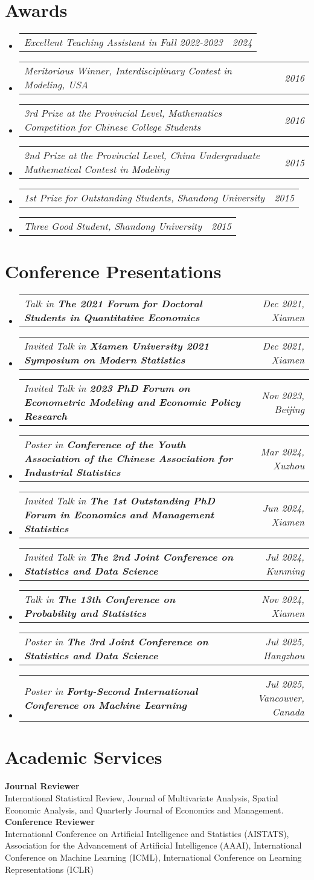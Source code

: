 \documentclass[letterpaper,10pt]{article}
\makeatletter
\newcommand{\resumeSubSubheading}[2]{
    \item
    \begin{tabular*}{0.97\textwidth}{l@{\extracolsep{\fill}}r}
      \textit{\small#1} & \textit{\small #2} \\
    \end{tabular*}\vspace{-7pt}
}
\newcommand{\resumeSubHeadingListStart}{\begin{itemize}[leftmargin=0.15in, label={}]}
\newcommand{\resumeSubHeadingListEnd}{\end{itemize}}
\makeatother
\begin{document}
  \section{Awards}
  \resumeSubHeadingListStart
    \resumeSubSubheading
      {Excellent Teaching Assistant in Fall 2022-2023}{2024}
    \resumeSubSubheading
      {Meritorious Winner, Interdisciplinary Contest in Modeling, USA}{2016}
    \resumeSubSubheading
      {3rd Prize at the Provincial Level, Mathematics Competition for Chinese College Students}{2016}
    \resumeSubSubheading
      {2nd Prize at the Provincial Level, China Undergraduate Mathematical Contest in Modeling}{2015}
    \resumeSubSubheading
      {1st Prize for Outstanding Students, Shandong University}{2015}
    \resumeSubSubheading
      {Three Good Student, Shandong University}{2015}
  \resumeSubHeadingListEnd




\section{Conference Presentations}
\resumeSubHeadingListStart
    \resumeSubSubheading
        {Talk in \textbf{The 2021 Forum for Doctoral Students in Quantitative Economics}}{Dec 2021, Xiamen}
    \resumeSubSubheading
        {Invited Talk in \textbf{Xiamen University 2021 Symposium on Modern Statistics}}{Dec 2021, Xiamen}
    \resumeSubSubheading
        {Invited Talk in \textbf{2023 PhD Forum on Econometric Modeling and Economic Policy Research}}{Nov 2023, Beijing}
    \resumeSubSubheading
        {Poster in \textbf{Conference of the Youth Association of the Chinese Association for Industrial Statistics}}{Mar 2024, Xuzhou}
    \resumeSubSubheading
        {Invited Talk in \textbf{The 1st Outstanding PhD Forum in Economics and Management Statistics}}{Jun 2024, Xiamen}
    \resumeSubSubheading
        {Invited Talk in \textbf{The 2nd Joint Conference on Statistics and Data Science}}{Jul 2024, Kunming}
    \resumeSubSubheading
        {Talk in \textbf{The 13th Conference on Probability and Statistics}}{Nov 2024, Xiamen}
    \resumeSubSubheading
        {Poster in \textbf{The 3rd Joint Conference on Statistics and Data Science}}{Jul 2025, Hangzhou}
    \resumeSubSubheading
        {Poster in \textbf{Forty-Second International Conference on Machine Learning}}{Jul 2025, Vancouver, Canada}
\resumeSubHeadingListEnd


\section{Academic Services}
 \textbf{ Journal Reviewer} \\
 {International Statistical Review}, {Journal of Multivariate Analysis}, {Spatial Economic Analysis}, and {Quarterly Journal of Economics and Management}.\\
 \textbf{Conference Reviewer} \\
 {International Conference on Artificial Intelligence and Statistics (AISTATS), Association for the Advancement of Artificial Intelligence (AAAI), International Conference on Machine Learning (ICML), International Conference on Learning Representations (ICLR)}
\end{document}
